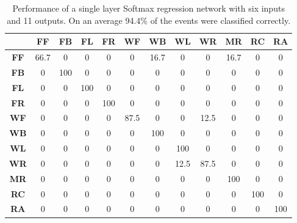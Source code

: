 \documentclass{IEEEtran}
\begin{document}
\begin{table}[htb]
\caption{Performance of a single layer Softmax regression network with six inputs and 11 outputs. On an average 94.4\% of the events were classified correctly.}
\label{tab:softmaxOnelayer}
\resizebox{\columnwidth}{!}
{
\begin{tabular}{|c|c|c|c|c|c|c|c|c|c|c|c|}
\hline 
& \textbf{FF} & \textbf{FB}  & \textbf{FL} & \textbf{FR} &  \textbf{WF} & 
\textbf{WB} & \textbf{WL} & \textbf{WR} & \textbf{MR} & 
\textbf{RC} & \textbf{RA} \\ \hline
\textbf{FF} & 66.7 &  0 &  0 &  0 &  0 &  16.7 &  0 &  0 &  16.7 &  0 &  0 \\ \hline
\textbf{FB} & 0 &  100 &  0 &  0 &  0 &  0 &  0 &  0 &  0 &  0 &  0 \\ \hline
\textbf{FL} & 0 &  0 &  100 &  0 &  0 &  0 &  0 &  0 &  0 &  0 &  0 \\ \hline
\textbf{FR} & 0 &  0 &  0 &  100 &  0 &  0 &  0 &  0 &  0 &  0 &  0 \\ \hline
\textbf{WF} & 0 &  0 &  0 &  0 &  87.5 &  0 &  0 &  12.5 &  0 &  0 &  0 \\ \hline
\textbf{WB} & 0 &  0 &  0 &  0 &  0 &  100 &  0 &  0 &  0 &  0 &  0 \\ \hline
\textbf{WL} & 0 &  0 &  0 &  0 &  0 &  0 &  100 &  0 &  0 &  0 &  0 \\ \hline
\textbf{WR} & 0 &  0 &  0 &  0 &  0 &  0 &  12.5 &  87.5 &  0 &  0 &  0 \\ \hline
\textbf{MR} & 0 &  0 &  0 &  0 &  0 &  0 &  0 &  0 &  100 &  0 &  0 \\ \hline
\textbf{RC} & 0 &  0 &  0 &  0 &  0 &  0 &  0 &  0 &  0 &  100 &  0 \\ \hline
\textbf{RA} & 0 &  0 &  0 &  0 &  0 &  0 &  0 &  0 &  0 &  0 &  100 \\ \hline
\end{tabular}
}
\end{table}
%
\end{document}
